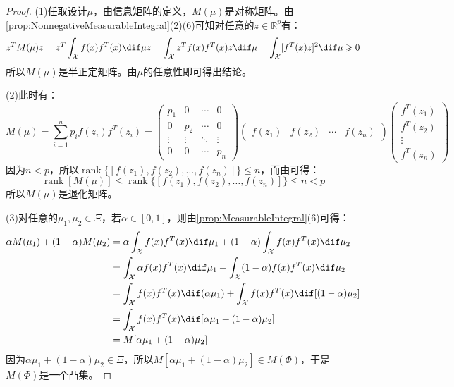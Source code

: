 \begin{proof}
	(1)任取设计$\mu$，由信息矩阵的定义，$M(\mu)$是对称矩阵。由\cref{prop:NonnegativeMeasurableIntegral}(2)(6)可知对任意的$z\in\mathbb{R}^{p}$有：
	\begin{equation*}
		z^TM(\mu)z=z^T\int_{\mathcal{X}}f(x)f^T(x)\dif\mu z=\int_{\mathcal{X}}z^Tf(x)f^T(x)z\dif\mu=\int_{\mathcal{X}}[f^T(x)z]^2\dif\mu\geqslant0
	\end{equation*}
	所以$M(\mu)$是半正定矩阵。由$\mu$的任意性即可得出结论。\par
	(2)此时有：
	\begin{equation*}
		M(\mu)=\sum_{i=1}^{n}p_if(z_i)f^T(z_i)=
		\begin{pmatrix}
			p_1 & 0 & \cdots & 0 \\
			0 & p_2 & \cdots & 0 \\
			\vdots & \vdots & \ddots & \vdots \\
			0 & 0 & \cdots & p_n 
		\end{pmatrix}
		\begin{pmatrix}
			f(z_1) & f(z_2) & \cdots & f(z_n)
		\end{pmatrix}
		\begin{pmatrix}
			f^T(z_1) \\
			f^T(z_2) \\
			\vdots \\
			f^T(z_n)
		\end{pmatrix}
	\end{equation*}
	因为$n<p$，所以$\operatorname{rank}\{[f(z_1),f(z_2),\dots,f(z_n)]\}\leqslant n$，而由可得：
	\begin{equation*}
		\operatorname{rank}[M(\mu)]\leqslant\operatorname{rank}\{[f(z_1),f(z_2),\dots,f(z_n)]\}\leqslant n<p
	\end{equation*}
	所以$M(\mu)$是退化矩阵。\par
	(3)对任意的$\mu_1,\mu_2\in\Xi$，若$\alpha\in[0,1]$，则由\cref{prop:MeasurableIntegral}(6)可得：
	\begin{align*}
		\alpha M(\mu_1)+(1-\alpha)M(\mu_2)&=\alpha\int_{\mathcal{X}}f(x)f^T(x)\dif\mu_1+(1-\alpha)\int_{\mathcal{X}}f(x)f^T(x)\dif\mu_2 \\
		&=\int_{\mathcal{X}}\alpha f(x)f^T(x)\dif\mu_1+\int_{\mathcal{X}}(1-\alpha)f(x)f^T(x)\dif\mu_2 \\
		&=\int_{\mathcal{X}}f(x)f^T(x)\dif(\alpha\mu_1)+\int_{\mathcal{X}}f(x)f^T(x)\dif[(1-\alpha)\mu_2] \\
		&=\int_{\mathcal{X}}f(x)f^T(x)\dif[\alpha\mu_1+(1-\alpha)\mu_2] \\
		&=M[\alpha\mu_1+(1-\alpha)\mu_2]
	\end{align*}
	因为$\alpha\mu_1+(1-\alpha)\mu_2\in\Xi$，所以$M[\alpha\mu_1+(1-\alpha)\mu_2]\in M(\Phi)$，于是$M(\Phi)$是一个凸集。\par
\end{proof}
